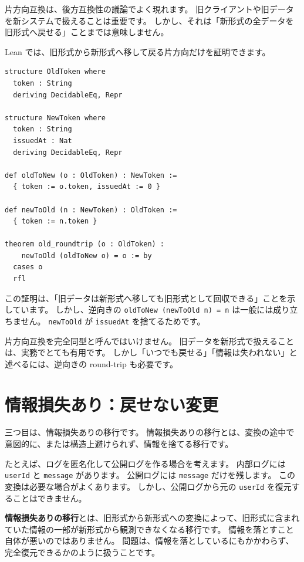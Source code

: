 片方向互換は、後方互換性の議論でよく現れます。
旧クライアントや旧データを新システムで扱えることは重要です。
しかし、それは「新形式の全データを旧形式へ戻せる」ことまでは意味しません。

Lean では、旧形式から新形式へ移して戻る片方向だけを証明できます。

\begin{listing}[htbp]
\begin{verbatim}
structure OldToken where
  token : String
  deriving DecidableEq, Repr

structure NewToken where
  token : String
  issuedAt : Nat
  deriving DecidableEq, Repr

def oldToNew (o : OldToken) : NewToken :=
  { token := o.token, issuedAt := 0 }

def newToOld (n : NewToken) : OldToken :=
  { token := n.token }

theorem old_roundtrip (o : OldToken) :
    newToOld (oldToNew o) = o := by
  cases o
  rfl
\end{verbatim}
\caption{\texttt{old\_roundtrip}}
\label{lst:ch27-one-way}
\end{listing}

この証明は、「旧データは新形式へ移しても旧形式として回収できる」ことを示しています。
しかし、逆向きの \texttt{oldToNew (newToOld n) = n} は一般には成り立ちません。
\texttt{newToOld} が \texttt{issuedAt} を捨てるためです。

片方向互換を完全同型と呼んではいけません。
旧データを新形式で扱えることは、実務でとても有用です。
しかし「いつでも戻せる」「情報は失われない」と述べるには、逆向きの round-trip も必要です。

\section{情報損失あり：戻せない変更}

三つ目は、情報損失ありの移行です。
情報損失ありの移行とは、変換の途中で意図的に、または構造上避けられず、情報を捨てる移行です。

たとえば、ログを匿名化して公開ログを作る場合を考えます。
内部ログには \texttt{userId} と \texttt{message} があります。
公開ログには \texttt{message} だけを残します。
この変換は必要な場合がよくあります。
しかし、公開ログから元の \texttt{userId} を復元することはできません。

\textbf{情報損失ありの移行}とは、旧形式から新形式への変換によって、旧形式に含まれていた情報の一部が新形式から観測できなくなる移行です。
情報を落とすこと自体が悪いのではありません。
問題は、情報を落としているにもかかわらず、完全復元できるかのように扱うことです。

